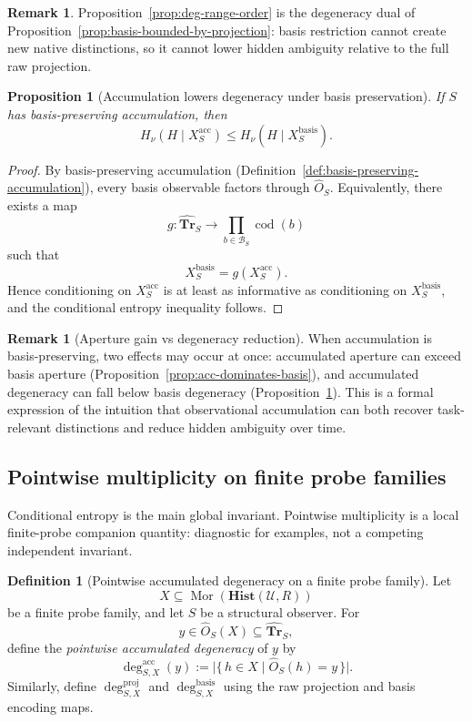 \documentclass[11pt,twoside]{article}
\newtheorem{proposition}[theorem]{Proposition}
\theoremstyle{definition}
\newtheorem{definition}[theorem]{Definition}
\newtheorem{remark}[theorem]{Remark}
\newcommand{\Hist}{\mathbf{Hist}}
\newcommand{\Tr}{\mathbf{Tr}}
\newcommand{\proj}{\mathrm{proj}}
\newcommand{\basis}{\mathrm{basis}}
\newcommand{\acc}{\mathrm{acc}}
\DeclareMathOperator{\Mor}{Mor}
\DeclareMathOperator{\cod}{cod}
\begin{document}
\begin{remark}
\label{rem:basis-deg-larger}
Proposition~\ref{prop:deg-range-order} is the degeneracy dual of Proposition~\ref{prop:basis-bounded-by-projection}: basis restriction cannot create new native distinctions, so it cannot lower hidden ambiguity relative to the full raw projection.
\end{remark}

\begin{proposition}[Accumulation lowers degeneracy under basis preservation]
\label{prop:acc-lowers-deg}
If \(S\) has basis-preserving accumulation, then
\[
  H_\nu(H\mid X_S^{\acc})
  \le
  H_\nu(H\mid X_S^{\basis}).
\]
\end{proposition}

\begin{proof}
By basis-preserving accumulation (Definition~\ref{def:basis-preserving-accumulation}), every basis observable factors through \(\widehat{O}_S\). Equivalently, there exists a map
\[
  g : \widehat{\Tr}_S \to \prod_{b\in\mathcal{B}_S}\cod(b)
\]
such that
\[
  X_S^{\basis} = g(X_S^{\acc}).
\]
Hence conditioning on \(X_S^{\acc}\) is at least as informative as conditioning on \(X_S^{\basis}\), and the conditional entropy inequality follows.
\end{proof}

\begin{remark}[Aperture gain vs degeneracy reduction]
\label{rem:aperture-gain-vs-deg-reduction}
When accumulation is basis-preserving, two effects may occur at once: accumulated aperture can exceed basis aperture (Proposition~\ref{prop:acc-dominates-basis}), and accumulated degeneracy can fall below basis degeneracy (Proposition~\ref{prop:acc-lowers-deg}). This is a formal expression of the intuition that observational accumulation can both recover task-relevant distinctions and reduce hidden ambiguity over time.
\end{remark}

\subsection{Pointwise multiplicity on finite probe families}
\label{subsec:pointwise-multiplicity}

Conditional entropy is the main global invariant. Pointwise multiplicity is a local finite-probe companion quantity: diagnostic for examples, not a competing independent invariant.

\begin{definition}[Pointwise accumulated degeneracy on a finite probe family]
\label{def:pointwise-acc-deg}
Let
\[
  X \subseteq \Mor(\Hist(\mathcal{U},R))
\]
be a finite probe family, and let \(S\) be a structural observer. For
\[
  y \in \widehat{O}_S(X) \subseteq \widehat{\Tr}_S,
\]
define the \emph{pointwise accumulated degeneracy} of \(y\) by
\[
  \deg^{\acc}_{S,X}(y)
  :=
  \bigl|
    \{\, h\in X \mid \widehat{O}_S(h)=y \,\}
  \bigr|.
\]
Similarly, define \(\deg^{\proj}_{S,X}\) and \(\deg^{\basis}_{S,X}\) using the raw projection and basis encoding maps.
\end{definition}
\end{document}
